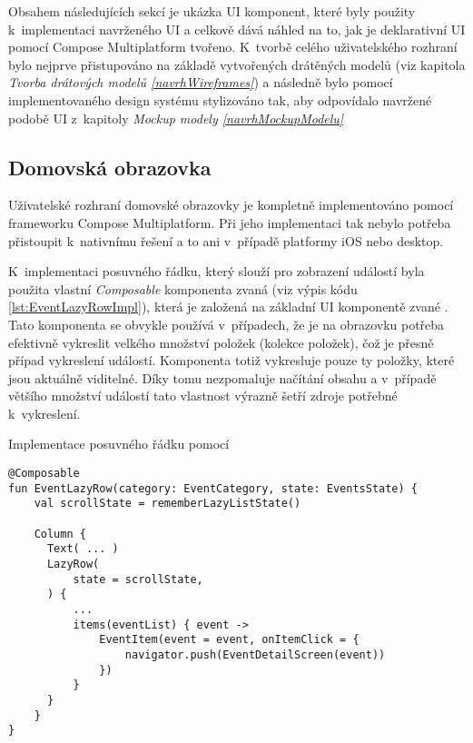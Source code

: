 

Obsahem následujících sekcí je ukázka UI komponent, které byly použity k~implementaci navrženého UI a celkově dává náhled na to,
jak je deklarativní UI pomocí Compose Multiplatform tvořeno. K~tvorbě celého uživatelského rozhraní bylo nejprve přistupováno na základě vytvořených 
drátěných modelů (viz kapitola \textit{Tvorba drátových modelů \ref{navrhWireframes}}) a následně bylo pomocí implementovaného design systému
stylizováno tak, aby odpovídalo navržené podobě UI z~kapitoly \textit{Mockup modely \ref{navrhMockupModelu}}

\subsection{Domovská obrazovka}
Uživatelské rozhraní domovské obrazovky je kompletně implementováno pomocí frameworku Compose Multiplatform. Při jeho implementaci tak nebylo potřeba
přistoupit k~nativnímu řešení a to ani v~případě platformy iOS nebo desktop.

K~implementaci posuvného řádku, který slouží pro zobrazení událostí byla použita vlastní \textit{Composable} komponenta zvaná  
(viz výpis kódu \ref{lst:EventLazyRowImpl}),
která je založená na základní UI komponentě zvané . Tato komponenta se obvykle používá v~případech, že je na obrazovku potřeba efektivně 
vykreslit velkého množství položek (kolekce položek), čož je přesně případ vykreslení událostí. Komponenta  totiž vykresluje pouze ty položky,
které jsou aktuálně viditelné. Díky tomu nezpomaluje načítání obsahu a v~případě většího množství událostí tato vlastnost výrazně šetří zdroje potřebné k~vykreslení.

\begin{listing}[H]
\caption{Implementace posuvného řádku pomocí }\label{lst:EventLazyRowImpl}
\begin{verbatim}
@Composable
fun EventLazyRow(category: EventCategory, state: EventsState) {
    val scrollState = rememberLazyListState()

    Column {
      Text( ... )
      LazyRow(
          state = scrollState,
      ) {
          ...
          items(eventList) { event ->
              EventItem(event = event, onItemClick = {
                  navigator.push(EventDetailScreen(event))
              })
          }
      }
    }
}  
\end{verbatim}
\end{listing}

